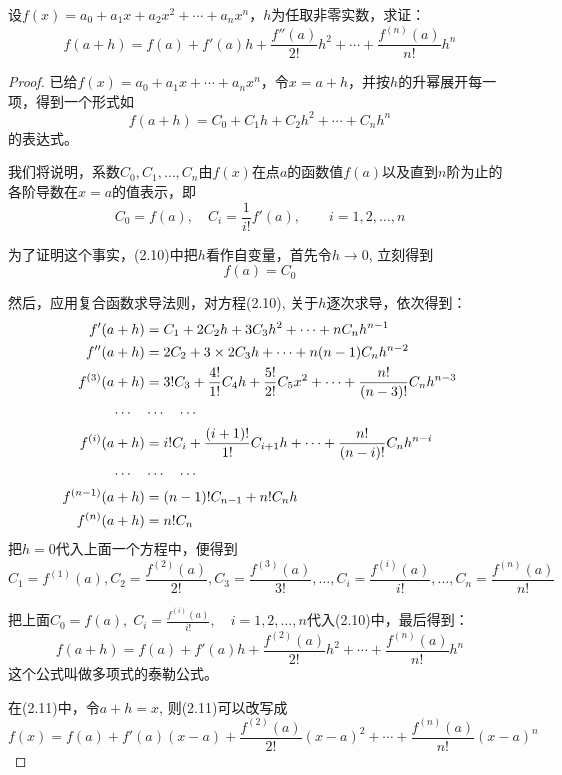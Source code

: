 \begin{example}
设$f(x)=a_0+a_1x+a_2x^2+\cdots+a_nx^n$，$h$为任取非零实数，求证：
\[f(a+h)=f(a)+f'(a)h+\frac{f''(a)}{2!}h^2+\cdots+\frac{f^{(n)}(a)}{n!}h^n\]
\end{example}


\begin{proof}
已给$f(x)=a_0+a_1x+\cdots+a_nx^n$，令$x=a+h$，并按$h$的升幂展开每一项，得到一个形式如
\begin{equation}
    f(a+h)=C_0+C_1 h+C_2 h^2+\cdots +C_n h^n
\end{equation}
的表达式。

我们将说明，系数$C_0,C_1,\ldots,C_n$由$f(x)$在点$a$的函数值$f(a)$以及直到$n$阶为止的各阶导数在$x=a$的值表示，即
\[C_0=f (a) ,\quad  C_i =\frac{1}{i!}f' (a) ,\qquad i=1, 2,\ldots ,n\]

为了证明这个事实，(2.10)中把$h$看作自变量，首先令$h\to 0$, 立刻得到
\[f (a) =C_0\]

然后，应用复合函数求导法则，对方程(2.10), 关于$h$逐次求导，依次得到：
\[\begin{split}
f'(a+h)&=C_1+2C_2 h+3C_3h^2+\cdots +nC_nh^{n-1}\\
f''(a+h)&=2C_2+3\times 2C_3h+\cdots+n(n-1)C_nh^{n-2}\\
f^{(3)}(a+h)&=3!C_3+\dfrac{4!}{1!}C_4h+\dfrac{5!}{2!}C_5x^2+\cdots+\dfrac{n!}{(n-3)!}C_nh^{n-3}\\
\cdots\quad &\cdots\quad \cdots\\
f^{(i)}(a+h)&=i! C_i+\dfrac{(i+1)!}{1!}C_{i+1}h+\cdots+\dfrac{n!}{(n-i)!}C_nh^{n-i}\\
\cdots\quad &\cdots\quad \cdots\\
f^{(n-1)}(a+h)&=(n-1)!C_{n-1}+n!C_nh\\
f^{(n)}(a+h)&=n!C_n
\end{split}\]
把$h=0$代入上面一个方程中，便得到
\[C_1=f^{(1)}(a),C_2=\frac{f^{(2)}(a)}{2!},C_3=\frac{f^{(3)}(a)}{3!},\ldots,C_i=\frac{f^{(i)}(a)}{i!},\ldots,C_n=\frac{f^{(n)}(a)}{n!}\]

把上面$C_0=f(a),\; C_i=\frac{f^{(i)}(a)}{i!},\quad i=1,2,\ldots,n$代入(2.10)中，最后得到：
\begin{equation}
    f(a+h)=f(a)+f'(a)h+\frac{f^{(2)}(a)}{2!}h^2+\cdots+\frac{f^{(n)}(a)}{n!}h^n
\end{equation}
这个公式叫做多项式的泰勒公式。

在(2.11)中，令$a+h=x$, 则(2.11)可以改写成
\[    f(x)=f(a)+f'(a)(x-a)+\frac{f^{(2)}(a)}{2!}(x-a)^2+\cdots+\frac{f^{(n)}(a)}{n!}(x-a)^n\]
\end{proof}


